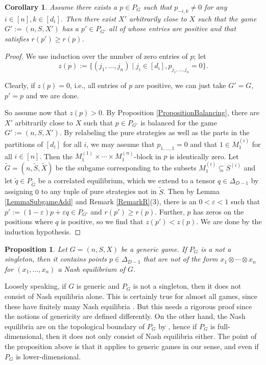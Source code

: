 \documentclass[11pt]{amsart}
\newtheorem{corollary}[theorem]{Corollary}
\newtheorem{proposition}[theorem]{Proposition}
\theoremstyle{definition}
\numberwithin{subcase}{case}
\renewcommand{\tilde}[1]{\widetilde{#1}}
\begin{document}
\begin{corollary}
\label{CorollaryNonZero}
Assume there exists a $p \in P_G$ such that $p_{-i,k} \neq 0$ for any
$i \in [n], k \in [d_i]$. Then there exist $X'$ arbitrarily close to $X$
such that the game $G':=(n,S,X')$ has a $p' \in P_{G'}$ all of whose
entries are positive and that satisfies $r(p') \geq r(p)$.
\end{corollary}
\begin{proof}
We use induction over the number of zero entries of $p$; let \[z(p):=\{(j_1, \dots, j_n) \mid j_i \in [d_i], p_{j_1, \dots, j_n}=0  \}.\]

Clearly, if $z(p)=0$, i.e., all entries of $p$ are positive, we can just take $G'=G$, $p'=p$ and we are done.

So assume now that $z(p)>0$. By Proposition \ref{PropositionBalancing}, there 
are $X'$ arbitrarily close to $X$ such that $p \in P_{G'}$ is balanced
for the game $G':=(n,S,X')$. By relabeling the pure strategies as well
as the parts in the partitions of $[d_i]$ for all $i$, we may assume
that $p_{1, \dots, 1}=0$ and that $1 \in M^{(i)}_1$ for all $i \in
[n]$. Then the $M^{(1)}_1 \times \cdots \times M^{(n)}_1$-block in $p$ is identically zero.  Let $\tilde{G}=(n,\tilde{S},\tilde{X})$ be the subgame
corresponding to the subsets $M^{(i)}_1 \subseteq S^{(i)}$ and let
$\tilde{q} \in P_{\tilde{G}}$ be a correlated equilibrium, which we
extend to a tensor $q \in \Delta_{D-1}$ by assigning $0$ to any 
tuple of pure strategies not in $\tilde{S}$. Then by Lemma
\ref{LemmaSubgameAdd} and Remark \ref{RemarkR}(3), there is an
$0<\varepsilon <1$ such that $p':=(1- \varepsilon)p + \varepsilon q
\in P_{G'}$ and $r(p') \geq r(p)$. Further, $p$ has zeros on the
positions where $q$ is positive, so we find that 
$z(p')<z(p)$. We are done by the induction hypothesis. 
\end{proof}

\begin{proposition} \label{prop:NotAllNash}
    Let $G=(n,S,X)$ be a generic game. If $P_G$ is a not a singleton, then it contains points $p \in \Delta_{D-1}$ that are {\em not} of the form $x_1 \otimes \cdots \otimes x_n$ for $(x_1,\ldots,x_n)$ a Nash equilibrium of $G$.
\end{proposition}

Loosely speaking, if $G$ is generic and $P_G$ is not a singleton, then it does not consist of Nash equilibria alone. This is certainly true for almost all games, since these have finitely many Nash equilibria \cite{Harsanyi73, Wilson71}. But this needs a rigorous proof since the notions of genericity are defined differently. On the other hand, the Nash equilibria are on the topological boundary of $P_G$ by \cite{NGH03}, hence if $P_G$ is full-dimensional, then it does not only consist of Nash equilibria either. The point of the proposition above is that it applies to generic games in our sense, and even if $P_G$ is lower-dimensional. 
\end{document}
